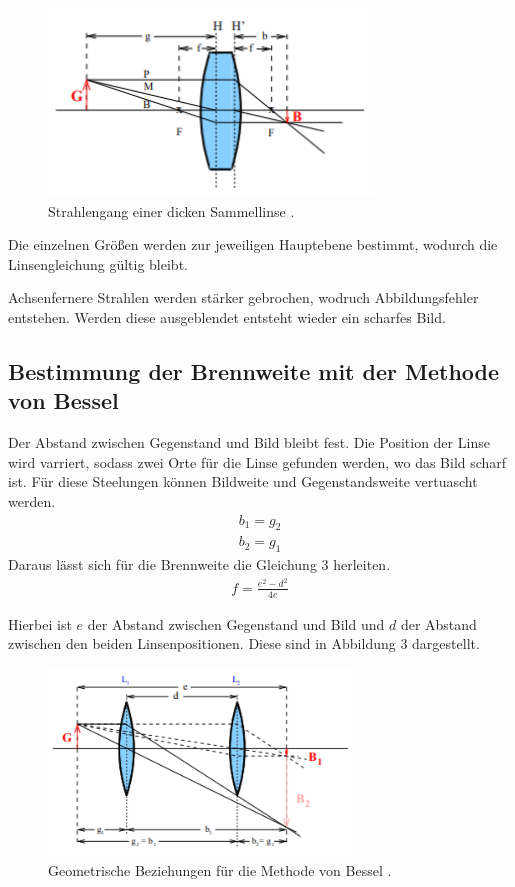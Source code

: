\begin{figure}[H]
  \centering
  \includegraphics[height=5cm]{dickelinse.PNG}
  \caption{Strahlengang einer dicken Sammellinse \cite{sample}.}
  \label{fig:biegungbild1}
\end{figure}

Die einzelnen Größen werden zur jeweiligen Hauptebene bestimmt, wodurch die Linsengleichung
gültig bleibt.

Achsenfernere Strahlen werden stärker gebrochen, wodruch Abbildungsfehler entstehen. Werden diese
ausgeblendet entsteht wieder ein scharfes Bild.

\subsection{Bestimmung der Brennweite mit der Methode von Bessel}
Der Abstand zwischen Gegenstand und Bild bleibt fest. Die Position der Linse wird varriert,
sodass zwei Orte für die Linse gefunden werden, wo das Bild scharf ist. Für diese
Steelungen können Bildweite und Gegenstandsweite vertuascht werden.
\begin{align*}
  b_1 = g_2 \\
  b_2 = g_1
\end{align*}
Daraus lässt sich für die Brennweite  die Gleichung 3 herleiten.
\begin{align}
  f = \frac{e^2 - d^2}{4e}
\end{align}

Hierbei ist $e$ der Abstand zwischen Gegenstand und Bild und $d$ der Abstand zwischen den
beiden Linsenpositionen. Diese sind in Abbildung 3 dargestellt.

\begin{figure}[H]
  \centering
  \includegraphics[height=5cm]{bessel.PNG}
  \caption{Geometrische Beziehungen für die Methode von Bessel \cite{sample}.}
  \label{fig:biegungbild1}
\end{figure}

